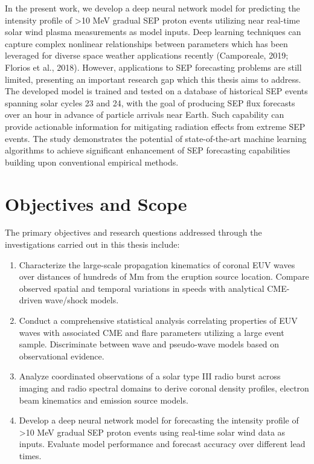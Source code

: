 In the present work, we develop a deep neural network model for predicting the intensity profile of >10 MeV gradual SEP proton events utilizing near real-time solar wind plasma measurements as model inputs. Deep learning techniques can capture complex nonlinear relationships between parameters which has been leveraged for diverse space weather applications recently (Camporeale, 2019; Florios et al., 2018). However, applications to SEP forecasting problems are still limited, presenting an important research gap which this thesis aims to address. The developed model is trained and tested on a database of historical SEP events spanning solar cycles 23 and 24, with the goal of producing SEP flux forecasts over an hour in advance of particle arrivals near Earth. Such capability can provide actionable information for mitigating radiation effects from extreme SEP events. The study demonstrates the potential of state-of-the-art machine learning algorithms to achieve significant enhancement of SEP forecasting capabilities building upon conventional empirical methods.


\section{Objectives and Scope}

The primary objectives and research questions addressed through the investigations carried out in this thesis include:

\begin{enumerate}
    \item Characterize the large-scale propagation kinematics of coronal EUV waves over distances of hundreds of Mm from the eruption source location. Compare observed spatial and temporal variations in speeds with analytical CME-driven wave/shock models.
    \item Conduct a comprehensive statistical analysis correlating properties of EUV waves with associated CME and flare parameters utilizing a large event sample. Discriminate between wave and pseudo-wave models based on observational evidence.
    \item Analyze coordinated observations of a solar type III radio burst across imaging and radio spectral domains to derive coronal density profiles, electron beam kinematics and emission source models.
    \item Develop a deep neural network model for forecasting the intensity profile of >10 MeV gradual SEP proton events using real-time solar wind data as inputs. Evaluate model performance and forecast accuracy over different lead times.
\end{enumerate}

